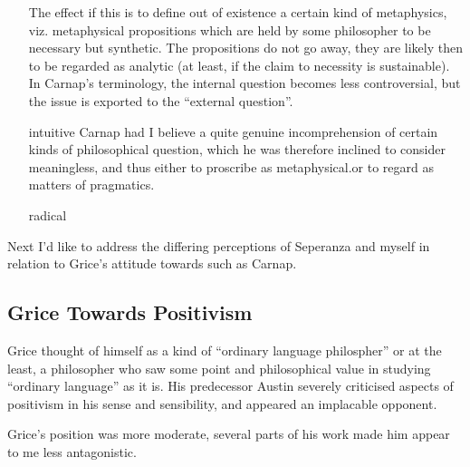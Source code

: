 \documentclass{rbjk}
\begin{document}
\begin{article}
\begin{itemize}
The effect if this is to define out of existence a certain kind of metaphysics, viz. metaphysical propositions which are held by some philosopher to be necessary but synthetic.
The propositions do not go away, they are likely then to be regarded as analytic (at least, if the claim to necessity is sustainable).
In Carnap's terminology, the internal question becomes less controversial, but the issue is exported to the ``external question''.


\item[intuitive]
Carnap had I believe a quite genuine incomprehension of certain kinds of philosophical question, which he was therefore inclined to consider meaningless, and thus either to proscribe as metaphysical.or to regard as matters of pragmatics.

\item[radical]


\end{itemize}








Next I'd like to address the differing perceptions of Seperanza and myself in relation to Grice's attitude towards such as Carnap.

\subsection{Grice Towards Positivism}

Grice thought of himself as a kind of ``ordinary language philospher'' or at the least, a philosopher who saw some point and philosophical value in studying ``ordinary language'' as it is.
His predecessor Austin severely criticised aspects of positivism in his sense and sensibility, and appeared an implacable opponent.

Grice's position was more moderate, several parts of his work made him appear to me less antagonistic.



%
%

\end{article}
\end{document}
